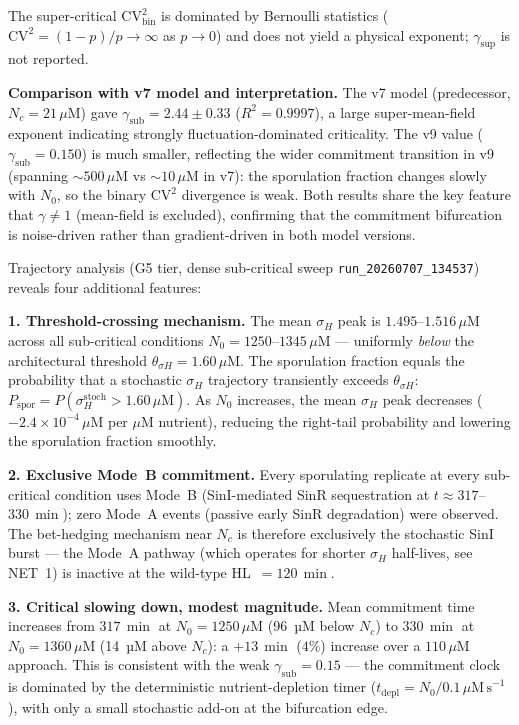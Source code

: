 \documentclass[11pt,a4paper]{article}
\newcommand{\CV}{\mathrm{CV}}
\begin{document}
The super-critical $\CV^2_{\mathrm{bin}}$ is dominated by Bernoulli statistics
($\CV^2 = (1-p)/p \to \infty$ as $p \to 0$) and does not yield a physical
exponent; $\gamma_{\mathrm{sup}}$ is not reported.

\textbf{Comparison with v7 model and interpretation.}
The v7 model (predecessor, $N_c = 21\,\mu$M) gave $\gamma_{\mathrm{sub}} = 2.44 \pm 0.33$
($R^2 = 0.9997$), a large super-mean-field exponent indicating strongly
fluctuation-dominated criticality.  The v9 value ($\gamma_{\mathrm{sub}} = 0.150$)
is much smaller, reflecting the wider commitment transition in v9 (spanning
$\sim 500\,\mu$M vs $\sim 10\,\mu$M in v7): the sporulation fraction changes
slowly with $N_0$, so the binary $\CV^2$ divergence is weak.
Both results share the key feature that $\gamma \neq 1$ (mean-field is excluded),
confirming that the commitment bifurcation is noise-driven rather than
gradient-driven in both model versions.

Trajectory analysis (G5 tier, dense sub-critical sweep
\texttt{run\_20260707\_134537}) reveals four additional features:

\textbf{1. Threshold-crossing mechanism.}
The mean $\sigma_H$ peak is $1.495$--$1.516\,\mu$M across all sub-critical
conditions $N_0 = 1250$--$1345\,\mu$M --- uniformly \emph{below} the
architectural threshold $\theta_{\sigma H} = 1.60\,\mu$M.
The sporulation fraction equals the probability that a stochastic $\sigma_H$
trajectory transiently exceeds $\theta_{\sigma H}$:
$P_{\mathrm{spor}} = P(\sigma_H^{\mathrm{stoch}} > 1.60\,\mu\mathrm{M})$.
As $N_0$ increases, the mean $\sigma_H$ peak decreases ($-2.4\times10^{-4}\,
\mu$M per $\mu$M nutrient), reducing the right-tail probability and lowering
the sporulation fraction smoothly.

\textbf{2. Exclusive Mode~B commitment.}
Every sporulating replicate at every sub-critical condition uses Mode~B
(SinI-mediated SinR sequestration at $t \approx 317$--$330\,\min$); zero
Mode~A events (passive early SinR degradation) were observed.
The bet-hedging mechanism near $N_c$ is therefore exclusively the stochastic
SinI burst --- the Mode~A pathway (which operates for shorter $\sigma_H$
half-lives, see NET~1) is inactive at the wild-type HL~$= 120\,\min$.

\textbf{3. Critical slowing down, modest magnitude.}
Mean commitment time increases from $317\,\min$ at $N_0 = 1250\,\mu$M (96~µM
below $N_c$) to $330\,\min$ at $N_0 = 1360\,\mu$M (14~µM above $N_c$): a
$+13\,\min$ ($4\%$) increase over a $110\,\mu$M approach.  This is consistent
with the weak $\gamma_{\mathrm{sub}} = 0.15$ --- the commitment clock is
dominated by the deterministic nutrient-depletion timer ($t_{\mathrm{depl}}
= N_0 / 0.1\,\mu\mathrm{M\,s}^{-1}$), with only a small stochastic add-on
at the bifurcation edge.
\end{document}
